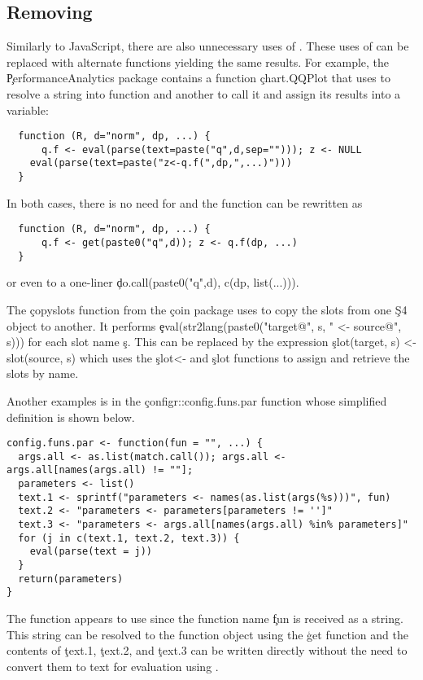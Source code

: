 \documentclass[review,screen,acmsmall]{acmart}
\begin{document}
\subsection{Removing \eval}

Similarly to JavaScript, there are also unnecessary uses of \eval. These uses of
\eval can be replaced with alternate functions yielding the same results. For
example, the \c{PerformanceAnalytics} package contains a function
\c{chart.QQPlot} that uses \eval to resolve a string into function and another
to call it and assign its results into a variable:
\begin{lstlisting}
  function (R, d="norm", dp, ...) {
	  q.f <- eval(parse(text=paste("q",d,sep=""))); z <- NULL
  	eval(parse(text=paste("z<-q.f(",dp,",...)")))
  }
\end{lstlisting}
  In both cases, there is no need for \eval and the function can be rewritten as
\begin{lstlisting}
  function (R, d="norm", dp, ...) {
	  q.f <- get(paste0("q",d)); z <- q.f(dp, ...)
  }
\end{lstlisting}
  or even to a one-liner \c{do.call(paste0("q",d), c(dp, list(...)))}.


  The \c{copyslots} function from the \c{coin} package uses \eval to copy the
  slots from one \c{S4} object to another. It performs
  \c{eval(str2lang(paste0("target@", s, " <- source@", s)))} for each slot name
  \c{s}. This can be replaced by the expression \c{slot(target, s) <- slot(source,
    s)} which uses the \c{slot<-} and \c{slot} functions to assign and retrieve
  the slots by name.

  Another examples is in the \c{configr::config.funs.par} function whose
  simplified definition is shown below.

\begin{lstlisting}
config.funs.par <- function(fun = "", ...) {
  args.all <- as.list(match.call()); args.all <- args.all[names(args.all) != ""];
  parameters <- list()
  text.1 <- sprintf("parameters <- names(as.list(args(%s)))", fun)
  text.2 <- "parameters <- parameters[parameters != '']"
  text.3 <- "parameters <- args.all[names(args.all) %in% parameters]"
  for (j in c(text.1, text.2, text.3)) {
    eval(parse(text = j))
  }
  return(parameters)
}
\end{lstlisting}

  The function appears to use \eval since the function name \c{fun} is received
  as a string. This string can be resolved to the function object using the
  \c{get} function and the contents of \c{text.1}, \c{text.2}, and \c{text.3}
  can be written directly without the need to convert them to text for
  evaluation using \eval.
\end{document}
